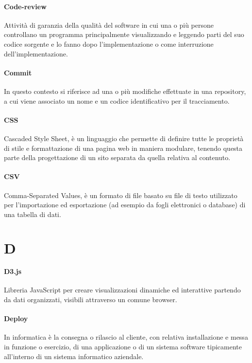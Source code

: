 \documentclass[]{article}
\begin{document}
	\paragraph*{Code-review}
	Attività di garanzia della qualità del software in cui una o più persone controllano un programma principalmente visualizzando e leggendo parti del suo codice sorgente e lo fanno dopo l'implementazione o come interruzione dell'implementazione.
	
	\paragraph*{Commit}
	In questo contesto si riferisce ad una o più modifiche effettuate in una repository, a cui viene associato un nome e un codice identificativo per il tracciamento.
	
	\paragraph*{CSS}
	Cascaded Style Sheet, è un linguaggio che permette di definire tutte le proprietà di stile e formattazione di una pagina web in maniera modulare, tenendo questa parte della progettazione di un sito separata da quella relativa al contenuto.
	
	\paragraph*{CSV}
	Comma-Separated Values, è un formato di file basato su file di testo utilizzato per l'importazione ed esportazione (ad esempio da fogli elettronici o database) di una tabella di dati.

	\newpage

	\section*{D}
	
	\paragraph*{D3.js}
	Libreria JavaScript per creare visualizzazioni dinamiche ed interattive partendo da dati organizzati, visibili attraverso un comune browser.
	
	\paragraph*{Deploy}
	In informatica è la consegna o rilascio al cliente, con relativa installazione e messa in funzione o esercizio, di una applicazione o di un sistema software tipicamente all’interno di un sistema informatico aziendale.
	
\end{document}
